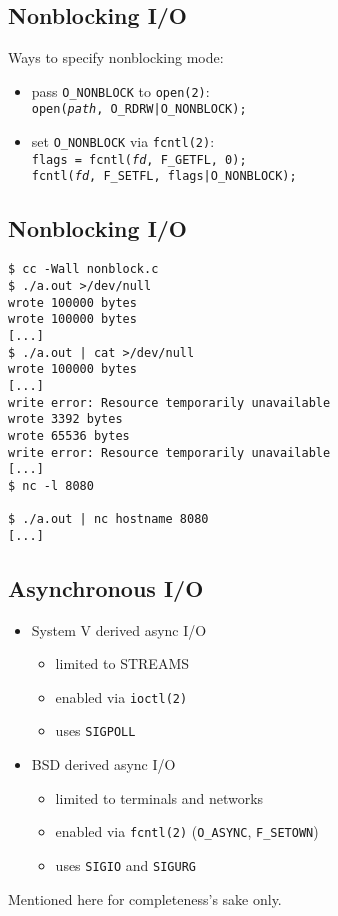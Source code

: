 \documentclass[xga]{xdvislides}
\begin{document}
\subsection{Nonblocking I/O}
Ways to specify nonblocking mode:
\begin{itemize}
	\item pass {\tt O\_NONBLOCK} to {\tt open(2)}: \\

		{\tt open({\em path}, O\_RDRW|O\_NONBLOCK);}
		\vspace{.2in}
	\item set {\tt O\_NONBLOCK} via {\tt fcntl(2)}: \\

		{\tt flags = fcntl({\em fd}, F\_GETFL, 0); \\
		     fcntl({\em fd}, F\_SETFL, flags|O\_NONBLOCK);}
\end{itemize}

\subsection{Nonblocking I/O}
\begin{verbatim}
$ cc -Wall nonblock.c
$ ./a.out >/dev/null
wrote 100000 bytes
wrote 100000 bytes
[...]
$ ./a.out | cat >/dev/null
wrote 100000 bytes
[...]
write error: Resource temporarily unavailable
wrote 3392 bytes
wrote 65536 bytes
write error: Resource temporarily unavailable
[...]
$ nc -l 8080

$ ./a.out | nc hostname 8080
[...]
\end{verbatim}

\subsection{Asynchronous I/O}
\begin{itemize}
	\item System V derived async I/O
		\begin{itemize}
			\item limited to STREAMS
			\item enabled via {\tt ioctl(2)}
			\item uses {\tt SIGPOLL}
		\end{itemize}
	\item BSD derived async I/O
		\begin{itemize}
			\item limited to terminals and networks
			\item enabled via {\tt fcntl(2)} ({\tt O\_ASYNC},
{\tt  F\_SETOWN})
			\item uses {\tt SIGIO} and {\tt SIGURG}
		\end{itemize}
\end{itemize}
\addvspace{.5in}
Mentioned here for completeness's sake only.
\end{document}
